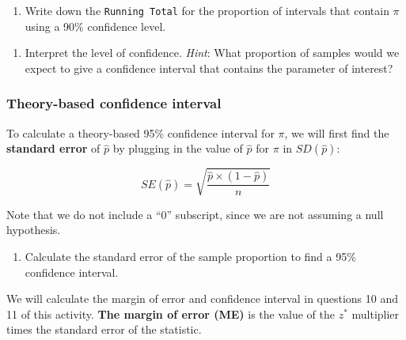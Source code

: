 \documentclass[
]{report}
\providecommand{\tightlist}{%
  \setlength{\itemsep}{0pt}\setlength{\parskip}{0pt}}
\begin{document}
\vspace{0.2in}

\begin{enumerate}
\def\labelenumi{\arabic{enumi}.}
\setcounter{enumi}{4}
\tightlist
\item
  Write down the \texttt{Running\ Total} for the proportion of intervals that contain \(\pi\) using a 90\% confidence level.
\end{enumerate}

\vspace{0.4in}

\begin{enumerate}
\def\labelenumi{\arabic{enumi}.}
\setcounter{enumi}{5}
\tightlist
\item
  Interpret the level of confidence. \emph{Hint}: What proportion of samples would we expect to give a confidence interval that contains the parameter of interest?
\end{enumerate}

\vspace{0.8in}

\subsubsection*{Theory-based confidence interval}\label{theory-based-confidence-interval}

To calculate a theory-based 95\% confidence interval for \(\pi\), we will first find the \textbf{standard error} of \(\hat{p}\) by plugging in the value of \(\hat{p}\) for \(\pi\) in \(SD(\hat{p})\):

\[SE(\hat{p}) = \sqrt{\frac{\hat{p}\times (1-\hat{p})}{n}}\]

Note that we do not include a ``0'' subscript, since we are not assuming a null hypothesis.

\begin{enumerate}
\def\labelenumi{\arabic{enumi}.}
\setcounter{enumi}{6}
\tightlist
\item
  Calculate the standard error of the sample proportion to find a 95\% confidence interval.
\end{enumerate}

\vspace{0.5in}

We will calculate the margin of error and confidence interval in questions 10 and 11 of this activity. \textbf{The margin of error (ME)} is the value of the \(z^*\) multiplier times the standard error of the statistic.
\end{document}
